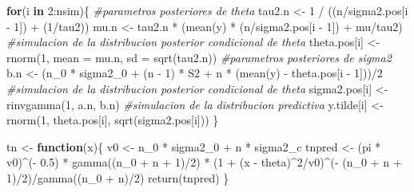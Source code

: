 \documentclass[
  10pt,
  spanish,
]{book}
\newenvironment{Shaded}{\begin{snugshade}}{\end{snugshade}}
\newcommand{\AttributeTok}[1]{\textcolor[rgb]{0.77,0.63,0.00}{#1}}
\newcommand{\CommentTok}[1]{\textcolor[rgb]{0.56,0.35,0.01}{\textit{#1}}}
\newcommand{\ControlFlowTok}[1]{\textcolor[rgb]{0.13,0.29,0.53}{\textbf{#1}}}
\newcommand{\DecValTok}[1]{\textcolor[rgb]{0.00,0.00,0.81}{#1}}
\newcommand{\FloatTok}[1]{\textcolor[rgb]{0.00,0.00,0.81}{#1}}
\newcommand{\FunctionTok}[1]{\textcolor[rgb]{0.00,0.00,0.00}{#1}}
\newcommand{\NormalTok}[1]{#1}
\newcommand{\OtherTok}[1]{\textcolor[rgb]{0.56,0.35,0.01}{#1}}
\newcommand{\SpecialCharTok}[1]{\textcolor[rgb]{0.00,0.00,0.00}{#1}}
\theoremstyle{definition}
\theoremstyle{definition}
\theoremstyle{definition}
\theoremstyle{definition}
\theoremstyle{remark}
\begin{document}
\begin{Shaded}
\begin{Highlighting}[]
\ControlFlowTok{for}\NormalTok{(i }\ControlFlowTok{in} \DecValTok{2}\SpecialCharTok{:}\NormalTok{nsim)\{}
  \CommentTok{\#parametros posteriores de theta  }
\NormalTok{  tau2.n }\OtherTok{\textless{}{-}} \DecValTok{1} \SpecialCharTok{/}\NormalTok{ ((n}\SpecialCharTok{/}\NormalTok{sigma2.pos[i }\SpecialCharTok{{-}} \DecValTok{1}\NormalTok{]) }\SpecialCharTok{+}\NormalTok{ (}\DecValTok{1}\SpecialCharTok{/}\NormalTok{tau2))}
\NormalTok{  mu.n }\OtherTok{\textless{}{-}}\NormalTok{ tau2.n }\SpecialCharTok{*}\NormalTok{ (}\FunctionTok{mean}\NormalTok{(y) }\SpecialCharTok{*}\NormalTok{ (n}\SpecialCharTok{/}\NormalTok{sigma2.pos[i }\SpecialCharTok{{-}} \DecValTok{1}\NormalTok{]) }\SpecialCharTok{+}\NormalTok{ mu}\SpecialCharTok{/}\NormalTok{tau2)}
  \CommentTok{\#simulacion de la distribucion posterior condicional de theta}
\NormalTok{  theta.pos[i] }\OtherTok{\textless{}{-}} \FunctionTok{rnorm}\NormalTok{(}\DecValTok{1}\NormalTok{, }\AttributeTok{mean =}\NormalTok{ mu.n, }\AttributeTok{sd =} \FunctionTok{sqrt}\NormalTok{(tau2.n))}
  \CommentTok{\#parametros posteriores de sigma2 }
\NormalTok{  b.n }\OtherTok{\textless{}{-}}\NormalTok{ (n\_0 }\SpecialCharTok{*}\NormalTok{ sigma2\_0 }\SpecialCharTok{+}\NormalTok{ (n }\SpecialCharTok{{-}} \DecValTok{1}\NormalTok{) }\SpecialCharTok{*}\NormalTok{ S2 }\SpecialCharTok{+} 
\NormalTok{          n }\SpecialCharTok{*}\NormalTok{ (}\FunctionTok{mean}\NormalTok{(y) }\SpecialCharTok{{-}}\NormalTok{ theta.pos[i }\SpecialCharTok{{-}} \DecValTok{1}\NormalTok{]))}\SpecialCharTok{/}\DecValTok{2}
  \CommentTok{\#simulacion de la distribucion posterior condicional de theta}
\NormalTok{  sigma2.pos[i] }\OtherTok{\textless{}{-}} \FunctionTok{rinvgamma}\NormalTok{(}\DecValTok{1}\NormalTok{, a.n, b.n)}
  \CommentTok{\#simulacion de la distribucion predictiva}
\NormalTok{  y.tilde[i] }\OtherTok{\textless{}{-}} \FunctionTok{rnorm}\NormalTok{(}\DecValTok{1}\NormalTok{, theta.pos[i], }\FunctionTok{sqrt}\NormalTok{(sigma2.pos[i]))}
\NormalTok{\}}

\NormalTok{tn }\OtherTok{\textless{}{-}} \ControlFlowTok{function}\NormalTok{(x)\{}
\NormalTok{    v0 }\OtherTok{\textless{}{-}}\NormalTok{ n\_0 }\SpecialCharTok{*}\NormalTok{ sigma2\_0 }\SpecialCharTok{+}\NormalTok{ n }\SpecialCharTok{*}\NormalTok{ sigma2\_c}
\NormalTok{    tnpred }\OtherTok{\textless{}{-}}\NormalTok{ (pi }\SpecialCharTok{*}\NormalTok{ v0)}\SpecialCharTok{\^{}}\NormalTok{(}\SpecialCharTok{{-}} \FloatTok{0.5}\NormalTok{) }\SpecialCharTok{*} \FunctionTok{gamma}\NormalTok{((n\_0 }\SpecialCharTok{+}\NormalTok{ n }\SpecialCharTok{+} \DecValTok{1}\NormalTok{)}\SpecialCharTok{/}\DecValTok{2}\NormalTok{) }\SpecialCharTok{*} 
\NormalTok{      (}\DecValTok{1} \SpecialCharTok{+}\NormalTok{ (x }\SpecialCharTok{{-}}\NormalTok{ theta)}\SpecialCharTok{\^{}}\DecValTok{2}\SpecialCharTok{/}\NormalTok{v0)}\SpecialCharTok{\^{}}\NormalTok{(}\SpecialCharTok{{-}}\NormalTok{ (n\_0 }\SpecialCharTok{+}\NormalTok{ n }\SpecialCharTok{+} \DecValTok{1}\NormalTok{)}\SpecialCharTok{/}\DecValTok{2}\NormalTok{)}\SpecialCharTok{/}\FunctionTok{gamma}\NormalTok{((n\_0 }\SpecialCharTok{+}\NormalTok{ n)}\SpecialCharTok{/}\DecValTok{2}\NormalTok{)}
    \FunctionTok{return}\NormalTok{(tnpred)}
\NormalTok{\}}


\end{Highlighting}
\end{Shaded}
\end{document}
